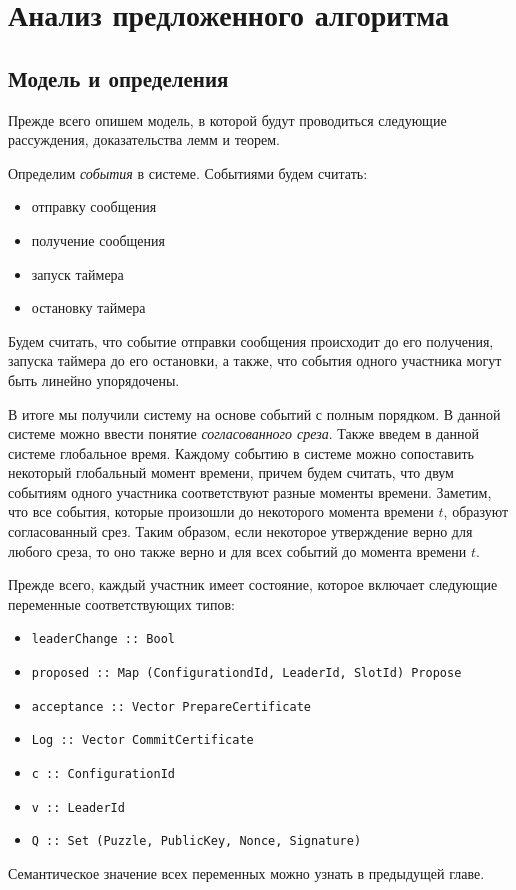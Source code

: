 
\chapter{Анализ предложенного алгоритма}  \label{chapter3}

\section{Модель и определения}
Прежде всего опишем модель, в которой будут проводиться следующие рассуждения, доказательства лемм и теорем.

Определим \textit{события} в системе. Событиями будем считать:
\begin{itemize}
\item отправку сообщения
\item получение сообщения
\item запуск таймера
\item остановку таймера
\end{itemize}

Будем считать, что событие отправки сообщения происходит до его получения, запуска таймера до его остановки, а также, что события одного участника могут быть линейно упорядочены.

В итоге мы получили систему на основе событий с полным порядком. В данной системе можно ввести понятие \textit{согласованного среза}\cite{cons_cut}. Также введем в данной системе глобальное время. Каждому событию в системе можно сопоставить некоторый глобальный момент времени, причем будем считать, что двум событиям одного участника соответствуют разные моменты времени. Заметим, что все события, которые произошли до некоторого момента времени $t$, образуют согласованный срез. Таким образом, если некоторое утверждение верно для любого среза, то оно также верно и для всех событий до момента времени $t$.

Прежде всего, каждый участник имеет состояние, которое включает следующие переменные соответствующих типов:
\begin{itemize}
\item \texttt{leaderChange :: Bool}
\item \texttt{proposed :: Map (ConfigurationdId, LeaderId, SlotId) Propose}
\item \texttt{acceptance :: Vector PrepareCertificate}
\item \texttt{Log      :: Vector CommitCertificate}
\item \texttt{c          :: ConfigurationId}
\item \texttt{v          :: LeaderId}
\item \texttt{Q         :: Set (Puzzle, PublicKey, Nonce, Signature)}
\end{itemize}
Семантическое значение всех переменных можно узнать в предыдущей главе.


